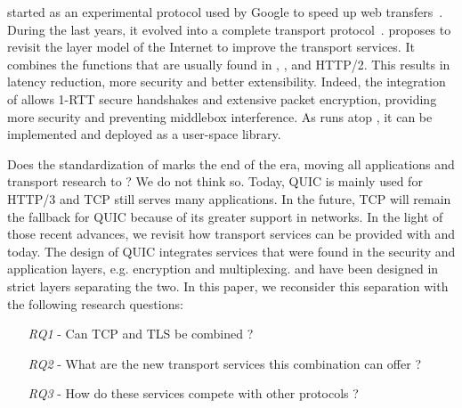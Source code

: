 \quic started as an experimental protocol used by Google to speed up web
transfers~\cite{roskind2013quic,langley2017quic}. During the last years, it
evolved into a complete transport protocol~\cite{rfc9000}. 
\quic proposes to
revisit the layer model of the Internet to improve the transport services.
It combines the functions that are usually found in \tcp, \tls, and HTTP/2. This results in
latency reduction, more security and better extensibility. Indeed, the integration of
 allows 1-RTT secure handshakes and extensive packet encryption, 
providing more security and preventing middlebox interference.
As \quic runs atop \udp, it can be implemented and deployed as a user-space library.

Does the standardization of \quic marks the end of the \tcp era, moving
all applications and transport research to \quic?  We do not think
so. Today, QUIC is mainly used for HTTP/3 and TCP still serves many applications.
In the future, TCP will remain the fallback for QUIC because of its greater support
in networks.
%
In the light of those recent advances, we revisit how transport services can be
provided with \tcp and \tls today. The design of QUIC integrates services
that were found in the security and application layers, e.g. encryption and multiplexing.
\tcp and \tls have been designed in strict layers separating the two.
In this paper, we reconsider this separation with the following research questions:

\begin{itemize}
	\item[{\small{\textit{RQ1}}} -] Can TCP and TLS be combined ?
	\item[{\small{\textit{RQ2}}} -] What are the new transport services this combination can offer ? 
	\item[{\small{\textit{RQ3}}} -] How do these services compete with other protocols ?
\end{itemize}

